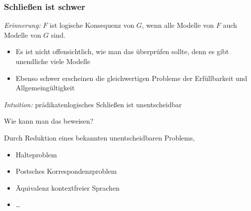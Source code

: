 \documentclass[onlymath]{beamer}
\begin{document}
\maketitle

\begin{frame}\frametitle{Schließen ist schwer}

\emph{Erinnerung:} $F$ ist logische Konsequenz von $G$, wenn alle Modelle von $F$ auch Modelle von $G$ sind.
\begin{itemize}
\item Es ist nicht offensichtlich, wie man das überprüfen sollte, denn es gibt unendliche viele Modelle
\item Ebenso schwer erscheinen die gleichwertigen Probleme der Erfüllbarkeit und Allgemeingültigkeit
\end{itemize}\pause
\emph{Intuition:} prädikatenlogisches Schließen ist unentscheidbar
\bigskip

\alert{Wie kann man das beweisen?}\pause\bigskip

Durch Reduktion eines bekannten unentscheidbaren Problems, 
\begin{itemize}
\item Halteproblem
\item Postsches Korrespondenzproblem
\item Äquivalenz kontextfreier Sprachen
\item \ldots
\end{itemize}

\end{frame}
\end{document}
